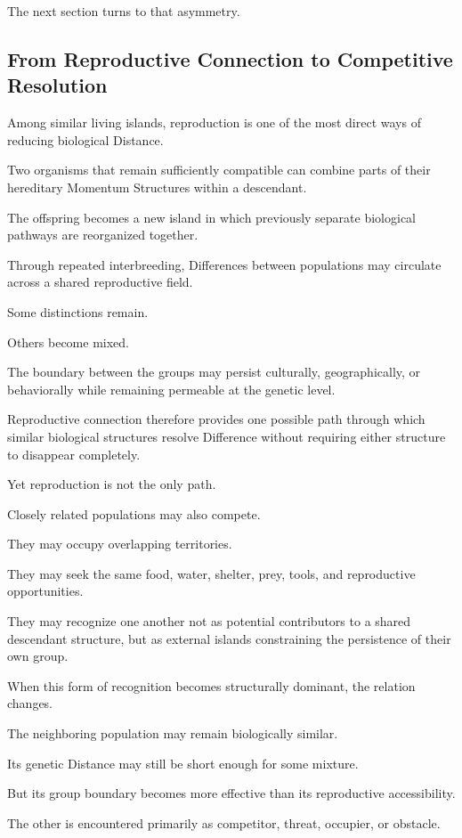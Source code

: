 The next section turns to that asymmetry.

\subsection*{\textbf{ From Reproductive Connection to Competitive Resolution}}


Among similar living islands, reproduction is one of the most direct ways of reducing biological Distance.

Two organisms that remain sufficiently compatible can combine parts of their hereditary Momentum Structures within a descendant.

The offspring becomes a new island in which previously separate biological pathways are reorganized together.

Through repeated interbreeding, Differences between populations may circulate across a shared reproductive field.

Some distinctions remain.

Others become mixed.

The boundary between the groups may persist culturally, geographically, or behaviorally while remaining permeable at the genetic level.

Reproductive connection therefore provides one possible path through which similar biological structures resolve Difference without requiring either structure to disappear completely.

Yet reproduction is not the only path.

Closely related populations may also compete.

They may occupy overlapping territories.

They may seek the same food, water, shelter, prey, tools, and reproductive opportunities.

They may recognize one another not as potential contributors to a shared descendant structure, but as external islands constraining the persistence of their own group.

When this form of recognition becomes structurally dominant, the relation changes.

The neighboring population may remain biologically similar.

Its genetic Distance may still be short enough for some mixture.

But its group boundary becomes more effective than its reproductive accessibility.

The other is encountered primarily as competitor, threat, occupier, or obstacle.

